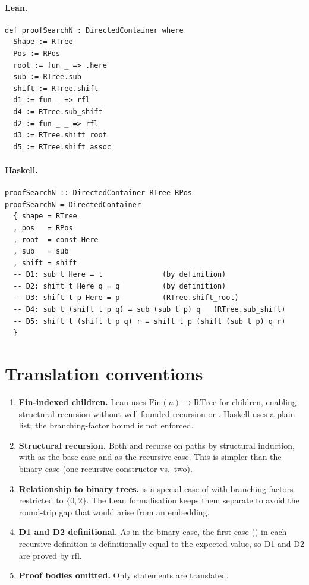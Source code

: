 \documentclass[11pt,a4paper]{article}
\begin{document}
\paragraph{Lean.}
\begin{lstlisting}[style=lean]
def proofSearchN : DirectedContainer where
  Shape := RTree
  Pos := RPos
  root := fun _ => .here
  sub := RTree.sub
  shift := RTree.shift
  d1 := fun _ => rfl
  d4 := RTree.sub_shift
  d2 := fun _ _ => rfl
  d3 := RTree.shift_root
  d5 := RTree.shift_assoc
\end{lstlisting}

\paragraph{Haskell.}
\begin{lstlisting}[style=haskell]
proofSearchN :: DirectedContainer RTree RPos
proofSearchN = DirectedContainer
  { shape = RTree
  , pos   = RPos
  , root  = const Here
  , sub   = sub
  , shift = shift
  -- D1: sub t Here = t              (by definition)
  -- D2: shift t Here q = q          (by definition)
  -- D3: shift t p Here = p          (RTree.shift_root)
  -- D4: sub t (shift t p q) = sub (sub t p) q   (RTree.sub_shift)
  -- D5: shift t (shift t p q) r = shift t p (shift (sub t p) q r)
  }
\end{lstlisting}


\section{Translation conventions}

\begin{enumerate}
\item \textbf{Fin-indexed children.}  Lean uses $\mathrm{Fin}(n) \to \mathrm{RTree}$
  for children, enabling structural recursion without well-founded recursion
  or .  Haskell uses a plain list; the branching-factor bound is
  not enforced.

\item \textbf{Structural recursion.}  Both  and 
  recurse on paths by structural induction, with  as the base case
  and  as the recursive case.  This is simpler than the
  binary case (one recursive constructor vs.\ two).

\item \textbf{Relationship to binary trees.}   is a
  special case of  with branching factors restricted to
  $\{0, 2\}$.  The Lean formalisation keeps them separate to avoid the
  round-trip gap that would arise from an embedding.

\item \textbf{D1 and D2 definitional.}  As in the binary case, the first
  case () in each recursive definition is definitionally equal to
  the expected value, so D1 and D2 are proved by $\mathrm{rfl}$.

\item \textbf{Proof bodies omitted.}  Only statements are translated.
\end{enumerate}
\end{document}
